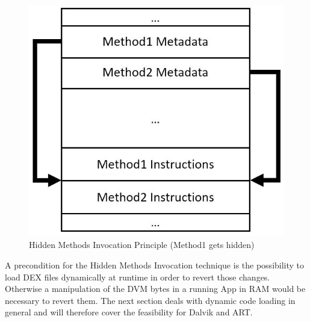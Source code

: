 \begin{figure}[htb]
  \centering
  \includegraphics[scale=0.4]{figures/hidden_method_invocation}
  \caption[Hidden Methods Invocation]{Hidden Methods Invocation Principle (Method1 gets hidden)}
  \label{fig:hidden_method_invocation}
\end{figure}

A precondition for the Hidden Methods Invocation technique is the
possibility to load DEX files dynamically at runtime in order to revert
those changes. Otherwise a manipulation of the DVM bytes in a running App in RAM would be necessary to revert them. The next section deals with dynamic
code loading in general and will therefore cover the feasibility for Dalvik
and ART.

